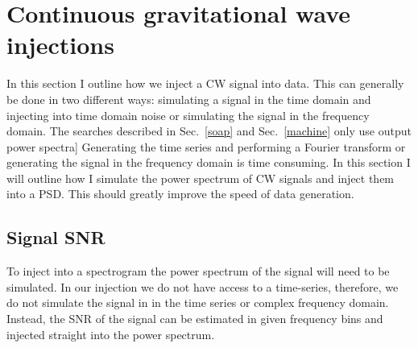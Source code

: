 \chapter{Continuous gravitational wave injections}

In this section I outline how we inject a \gls{CW} signal into data. This can generally be done in two different ways: simulating a signal in the time domain and injecting into time domain noise or simulating the signal in the frequency domain. 
The searches described in Sec.~\ref{soap} and Sec.~\ref{machine} only use output power spectra] 
Generating the time series and performing a Fourier transform or generating the signal in the frequency domain is time consuming. 
In this section I will outline how I simulate the power spectrum of \gls{CW} signals and inject them into a \gls{PSD}.
This should greatly improve the speed of data generation.


\section{Signal SNR}

To inject into a spectrogram the power spectrum of the signal will need to be simulated. In our injection we do not have access to a time-series, therefore, we do not simulate the signal in in the time series or complex frequency domain. 
Instead, the \gls{SNR} of the signal can be estimated in given frequency bins and injected straight into the power spectrum.

